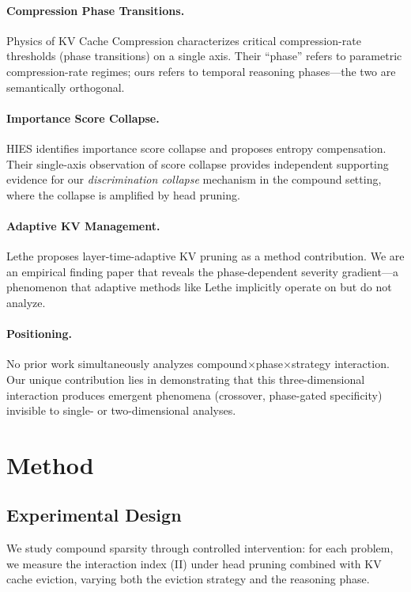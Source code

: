 \documentclass[11pt]{article}
\begin{document}
\paragraph{Compression Phase Transitions.}
Physics of KV Cache Compression \citep{physicskv2026} characterizes critical compression-rate thresholds (phase transitions) on a single axis. Their ``phase'' refers to parametric compression-rate regimes; ours refers to temporal reasoning phases---the two are semantically orthogonal.

\paragraph{Importance Score Collapse.}
HIES \citep{hies2025} identifies importance score collapse and proposes entropy compensation. Their single-axis observation of score collapse provides independent supporting evidence for our \emph{discrimination collapse} mechanism in the compound setting, where the collapse is amplified by head pruning.

\paragraph{Adaptive KV Management.}
Lethe \citep{lethe2026} proposes layer-time-adaptive KV pruning as a method contribution. We are an empirical finding paper that reveals the phase-dependent severity gradient---a phenomenon that adaptive methods like Lethe implicitly operate on but do not analyze.

\paragraph{Positioning.}
No prior work simultaneously analyzes compound$\times$phase$\times$strategy interaction. Our unique contribution lies in demonstrating that this three-dimensional interaction produces emergent phenomena (crossover, phase-gated specificity) invisible to single- or two-dimensional analyses.

\section{Method}

\subsection{Experimental Design}

We study compound sparsity through controlled intervention: for each problem, we measure the interaction index (II) under head pruning combined with KV cache eviction, varying both the eviction strategy and the reasoning phase.
\end{document}
